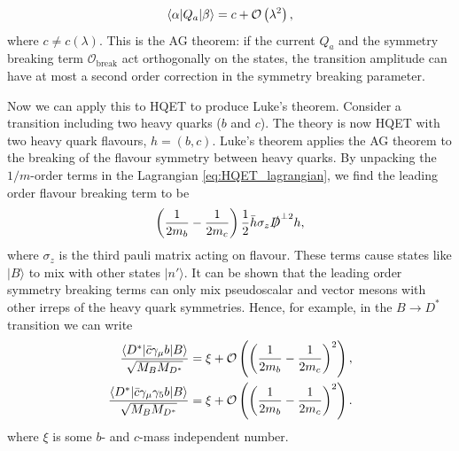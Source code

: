 \begin{align}
  \langle \alpha | Q_a | \beta \rangle = c + \mathcal{O}\left( \lambda^2 \right),
\end{align}
where $c\neq c(\lambda)$. This is the AG theorem: if the current $Q_a$ and the symmetry breaking term $\mathcal{O}_{\text{break}}$ act orthogonally on the states, the transition amplitude can have at most a second order correction in the symmetry breaking parameter.

Now we can apply this to HQET to produce Luke's theorem. Consider a transition including two heavy quarks ($b$ and $c$). %
The theory is now HQET with two heavy quark flavours, $h=(b,c)$. Luke's theorem applies the AG theorem to the breaking of the flavour symmetry between heavy quarks. By unpacking the $1/m$-order terms in the Lagrangian \eqref{eq:HQET_lagrangian}, we find the leading order flavour breaking term to be
\begin{align}
  \left({1\over 2m_b} - {1\over 2m_c} \right) {1\over 2} \bar{h} \sigma_z \slashed{D}^{\perp 2} h,
\end{align}
where $\sigma_z$ is the third pauli matrix acting on flavour. These terms cause states like $| B \rangle$ to mix with other states $|n'\rangle$. It can be shown \cite{Lebed:1991sq} that the leading order symmetry breaking terms can only mix pseudoscalar and vector mesons with other irreps of the heavy quark symmetries. Hence, for example, in the $B \to D^*$ transition we can write
\begin{align}
  {\langle D^* | \bar{c}\gamma_{\mu} b | B \rangle \over \sqrt{M_B M_{D^*}}} &= \xi + \mathcal{O}\left( \left( {1\over 2m_b} - {1\over 2m_c} \right)^2 \right), \\
  {\langle D^* | \bar{c}\gamma_{\mu}\gamma_5 b | B \rangle \over \sqrt{M_B M_{D^*}}} &= \xi + \mathcal{O}\left( \left( {1\over 2m_b} - {1\over 2m_c} \right)^2 \right).
\end{align}
where $\xi$ is some $b$- and $c$-mass independent number.

